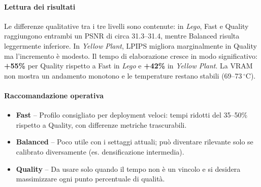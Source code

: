 \paragraph{Lettura dei risultati}
Le differenze qualitative tra i tre livelli sono contenute: in \textit{Lego}, Fast e Quality
raggiungono entrambi un PSNR di circa 31.3--31.4, mentre Balanced risulta leggermente inferiore.
In \textit{Yellow Plant}, LPIPS migliora marginalmente in Quality ma l’incremento è modesto.
Il tempo di elaborazione cresce in modo significativo: \textbf{+55\%} per Quality rispetto a Fast
in \textit{Lego} e \textbf{+42\%} in \textit{Yellow Plant}.
La VRAM non mostra un andamento monotono e le temperature restano stabili (69--73\,${}^\circ$C).

\paragraph{Raccomandazione operativa}
\begin{itemize}
	\item \textbf{Fast} -- Profilo consigliato per deployment veloci: tempi ridotti del 35--50\% rispetto a Quality, con differenze metriche trascurabili.
	\item \textbf{Balanced} -- Poco utile con i settaggi attuali; può diventare rilevante solo se calibrato diversamente (es. densificazione intermedia).
	\item \textbf{Quality} -- Da usare solo quando il tempo non è un vincolo e si desidera massimizzare ogni punto percentuale di qualità.
\end{itemize}

